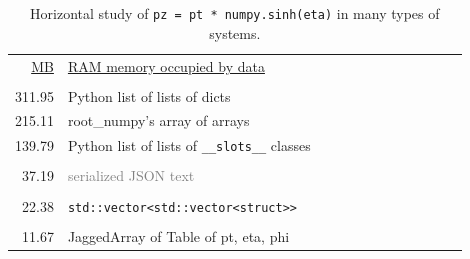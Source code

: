 \documentclass{webofc}
\begin{document}
\begin{table}
\caption{Horizontal study of \texttt{pz = pt * numpy.sinh(eta)} in many types of systems. \label{quantify}}

\begin{minipage}{0.4\linewidth}\scriptsize
\begin{tabular}{r p{0.9\linewidth}}
\underline{MB} & \underline{RAM memory occupied by data} \\
& \\
311.95 & \textcolor{pythoncolor}{Python list of lists of dicts} \\
215.11 & \textcolor{rootnpcolor}{root\_numpy's array of arrays} \\
139.79 & \textcolor{pythoncolor}{Python list of lists of {\tt \_\_slots\_\_} classes} \\
& \\
 37.19 & \textcolor{gray}{serialized JSON text} \\
& \\
 22.38 & \textcolor{cppcolor}{{\tt\scriptsize std::vector<std::vector<struct>>}} \\
& \\
 11.67 & \textcolor{mycolor}{JaggedArray of Table of pt, eta, phi} \\
\end{tabular}


\end{minipage}
\end{table}
\end{document}
